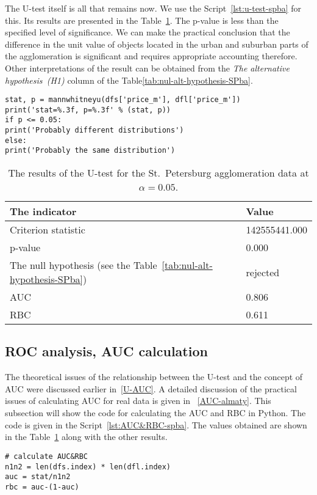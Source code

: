 \documentclass[]{scrreprt}
\begin{document}
The U-test itself is all that remains now. We use the Script~\ref{lst:u-test-spba} for this. Its results are presented in the Table~\ref{tab:u-test-py-result}. The p-value is less than the specified level of significance. We can make the practical conclusion that the difference in the unit value of objects located in the urban and suburban parts of the agglomeration is significant and requires appropriate accounting therefore. Other interpretations of the result can be obtained from the \textit{The alternative hypothesis~(H1)} column of the Table\ref{tab:nul-alt-hypothesis-SPba}.
%
\begin{lstlisting}[float=htp, caption = Wilcoxon--~Mann--~Whitney test for the data of unit prices of apartment offers in the agglomeration of St.~Petersburg, firstnumber=1, label= lst:u-test-spba]
stat, p = mannwhitneyu(dfs['price_m'], dfl['price_m'])
print('stat=%.3f, p=%.3f' % (stat, p))
if p <= 0.05:
print('Probably different distributions')
else:
print('Probably the same distribution')
\end{lstlisting}  
%
\begin{table}[htp]
	\caption{The results of the U-test for the St.~Petersburg agglomeration data at $\alpha=0.05$.}\label{tab:u-test-py-result}
	\centering
	\begin{tabular}{ll}
		\hline
		The indicator&Value\\
		\hline
		Criterion statistic&142555441.000\\
		\hline
		p-value&0.000\\
		\hline
		The null hypothesis (see the Table~\ref{tab:nul-alt-hypothesis-SPba})&rejected\\
		\hline
		AUC&0.806\\
		\hline
		RBC&0.611\\
		\hline
	\end{tabular}
\end{table}
%
\subsection{ROC analysis, AUC calculation}
The theoretical issues of the relationship between the U-test and the concept of AUC were discussed earlier in~\ref{U-AUC}. A detailed discussion of the practical issues of calculating AUC for real data is given in ~\ref{AUC-almaty}. This subsection will show the code for calculating the AUC and RBC in Python. The code is given in the Script~\ref{lst:AUC&RBC-spba}. The values obtained are shown in the Table~\ref{tab:u-test-py-result} along with the other results.
%
\begin{lstlisting}[float=htp, caption = Calculation of AUC and RBC for St.~Petersburg agglomeration data, firstnumber=1, label= lst:AUC&RBC-spba]
# calculate AUC&RBC
n1n2 = len(dfs.index) * len(dfl.index)
auc = stat/n1n2
rbc = auc-(1-auc)
\end{lstlisting}  
%
\end{document}
